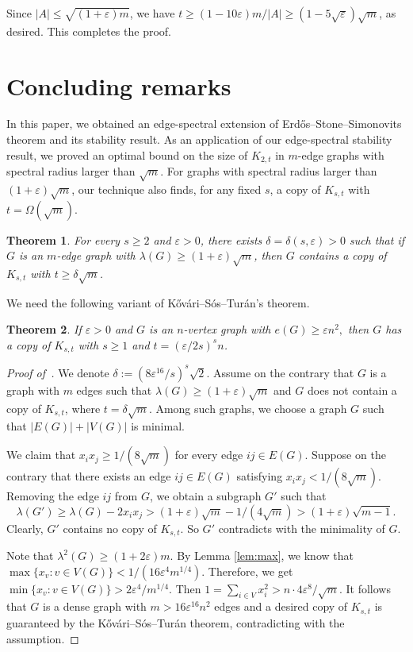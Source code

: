 \documentclass[11pt,a4paper]{article}
\newtheorem{theorem}{Theorem}[section]
\theoremstyle{definition}
\theoremstyle{remark}
\begin{document}
Since $|A|\le \sqrt{(1+\varepsilon)m}$, we have $t\ge (1- 10\varepsilon)m/|A| \ge (1-5\sqrt{\varepsilon })\sqrt{m}$, as desired. This completes the proof.

\section{Concluding remarks}\label{sec:concluding}
In this paper, we obtained an edge-spectral extension of Erd\H{o}s--Stone--Simonovits theorem and its stability result. As an application of our edge-spectral stability result, we proved an optimal bound on the size of $K_{2,t}$ in $m$-edge graphs with spectral radius larger than $\sqrt{m}$. For graphs with spectral radius larger than $(1 + \varepsilon)\sqrt{m}$, our technique also finds, for any fixed $s$, a copy of $K_{s,t}$ with $t=\Omega(\sqrt{m})$.

\begin{theorem} \label{thm-squar-root}
For every $s\ge 2$ and $\varepsilon >0$, 
there exists $\delta = \delta (s,\varepsilon)>0$ such that 
if $G$ is an $m$-edge graph with 
$\lambda (G)\ge (1+ \varepsilon )\sqrt{m}$, then $G$ contains a copy 
of $K_{s,t}$ with $t\ge \delta \sqrt{m}$. 
\end{theorem}

We need the following variant of K\H{o}v\'{a}ri--S\'{o}s--Tur\'an's theorem. 

\begin{theorem} \label{prop-linear-size}
If $\varepsilon >0$ and $G$ is an $n$-vertex graph with $e(G)\ge \varepsilon n^2,$
then $G$ has a copy of 
$K_{s,t}$ with $s\ge 1$ and $t= (\varepsilon/{2s})^s n$. 
\end{theorem} 

\begin{proof}[Proof of~]
We denote $\delta := (8\varepsilon^{16}/s)^{s}\sqrt{2}$. 
Assume on the contrary that 
$G$ is a graph with $m$ edges such that 
$\lambda (G)\ge (1+ \varepsilon )\sqrt{m}$ and
$G$ does not contain a copy of $K_{s,t}$, where 
$t=\delta \sqrt{m}$. 
Among such graphs, we choose a graph $G$ such that $|E(G)| + |V(G)|$ is minimal. 


We claim that $x_ix_j \ge 
1 / (8\sqrt{m})$ for every edge $ij\in E(G)$. 
Suppose on the contrary that there exists an edge $ij\in E(G)$ satisfying $x_ix_j < 1 / (8\sqrt{m})$.  
Removing the edge $ij$ from 
$G$, we obtain a subgraph $G'$ such that 
\[ \lambda (G')\ge \lambda (G) - 2x_ix_j 
>(1+\varepsilon)\sqrt{m} - 1 / (4\sqrt{m}) 
> (1+\varepsilon)\sqrt{m-1}. \]  
Clearly, $G'$ contains no copy of $K_{s,t}$. 
So $G'$ contradicts with the minimality of $G$.


Note that $\lambda^2(G)\ge (1+2\varepsilon)m$. 
By Lemma \ref{lem:max}, we know that 
$\max\{x_v: v\in V(G)\} < 1/(16\varepsilon^4 m^{1/4})$. 
Therefore, we get $\min\{x_v: v\in V(G)\} 
> 2\varepsilon^4/m^{1/4}$. 
Then $1=\sum_{i\in V} x_i^2 > n \cdot 4\varepsilon^8/\sqrt{m}$. It follows that  
 $G$ is a dense graph with 
$m>16 \varepsilon^{16} n^2$ edges and a desired copy of $K_{s,t}$ is guaranteed by the K\H{o}v\'{a}ri--S\'{o}s--Tur\'an theorem,  contradicting with the assumption. 
\end{proof}
\end{document}

